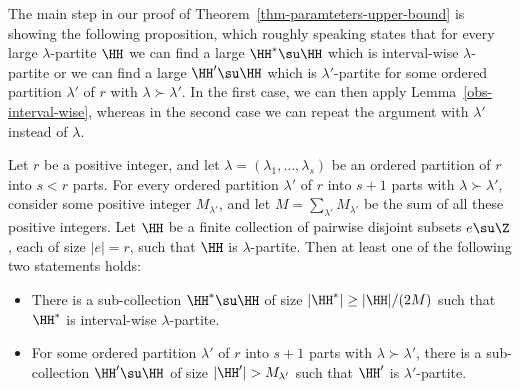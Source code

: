 The main step in our proof of Theorem~\ref{thm-paramteters-upper-bound} is showing the following proposition, which roughly speaking states that for every large $\lambda$-partite $\HH$ we can find a large $\HH^*\su \HH$ which is interval-wise $\lambda$-partite or we can find a large $\HH'\su \HH$ which is $\lambda'$-partite for some ordered partition $\lambda'$ of $r$ with $\lambda\succ \lambda'$. In the first case, we can then apply Lemma~\ref{obs-interval-wise}, whereas in the second case we can repeat the argument with $\lambda'$ instead of $\lambda$.

\begin{proposition}\label{prop-two-options}
Let $r$ be a positive integer, and let $\lambda=(\lambda_1,\dots,\lambda_s)$ be an ordered partition of $r$ into $s<r$ parts. For every ordered partition $\lambda'$ of $r$ into $s+1$ parts with $\lambda\succ\lambda'$, consider some positive integer $M_{\lambda'}$, and let $M=\sum_{\lambda'} M_{\lambda'}$ be the sum of all these positive integers. Let $\HH$ be a finite collection of pairwise disjoint subsets $e\su \Z$, each of size $|e|=r$, such that $\HH$ is $\lambda$-partite. Then at least one of the following two statements holds:
\begin{itemize}
    \item[(a)] There is a sub-collection $\HH^*\su \HH$ of size $|\HH^*|\ge |\HH|/(2M)$ such that $\HH^*$ is interval-wise $\lambda$-partite.
    \item[(b)] For some ordered partition $\lambda'$ of $r$ into $s+1$ parts with $\lambda\succ\lambda'$, there is a sub-collection $\HH'\su \HH$ of size $|\HH'|>M_{\lambda'}$ such that $\HH'$ is $\lambda'$-partite.
\end{itemize}
\end{proposition}


